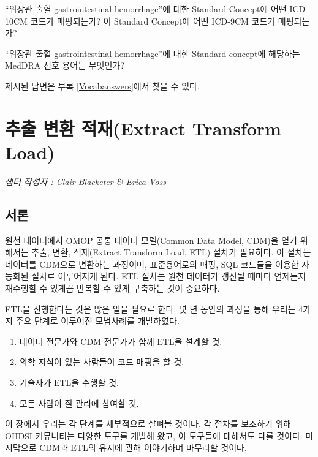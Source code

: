 \documentclass[11pt]{book}
\providecommand{\tightlist}{%
  \setlength{\itemsep}{0pt}\setlength{\parskip}{0pt}}
\theoremstyle{definition}
\theoremstyle{definition}
\theoremstyle{definition}
\theoremstyle{remark}
\let\BeginKnitrBlock\begin \let\EndKnitrBlock\end
\begin{document}
\BeginKnitrBlock{exercise}
\protect\hypertarget{exr:exerciseVocab2}{}{\label{exr:exerciseVocab2}
}``위장관 출혈 gastrointestinal hemorrhage''에 대한 Standard Concept에
어떤 ICD-10CM 코드가 매핑되는가? 이 Standard Concept에 어떤 ICD-9CM
코드가 매핑되는가?
\EndKnitrBlock{exercise}

\BeginKnitrBlock{exercise}
\protect\hypertarget{exr:exerciseVocab3}{}{\label{exr:exerciseVocab3}
}``위장관 출혈 gastrointestinal hemorrhage''에 대한 Standard concept에
해당하는 MedDRA 선호 용어는 무엇인가?
\EndKnitrBlock{exercise}

제시된 답변은 부록 \ref{Vocabanswers}에서 찾을 수 있다.

\chapter{추출 변환 적재(Extract Transform
Load)}\label{ExtractTransformLoad}

\emph{챕터 작성자 : Clair Blacketer \& Erica Voss}

\section{서론}

원천 데이터에서 OMOP 공통 데이터 모델(Common Data Model, CDM)을 얻기
위해서는 추출, 변환, 적재(Extract Transform Load, ETL) 절차가 필요하다.
이 절차는 데이터를 CDM으로 변환하는 과정이며, 표준용어로의 매핑, SQL
코드들을 이용한 자동화된 절차로 이루어지게 된다. ETL 절차는 원천
데이터가 갱신될 때마다 언제든지 재수행할 수 있게끔 반복할 수 있게
구축하는 것이 중요하다.
 
 

ETL을 진행한다는 것은 많은 일을 필요로 한다. 몇 년 동안의 과정을 통해
우리는 4가지 주요 단계로 이루어진 모범사례를 개발하였다.

\begin{enumerate}
\def\labelenumi{\arabic{enumi}.}
\tightlist
\item
  데이터 전문가와 CDM 전문가가 함께 ETL을 설계할 것.
\item
  의학 지식이 있는 사람들이 코드 매핑을 할 것.
\item
  기술자가 ETL을 수행할 것.
\item
  모든 사람이 질 관리에 참여할 것.
\end{enumerate}

이 장에서 우리는 각 단계를 세부적으로 살펴볼 것이다. 각 절차를 보조하기
위해 OHDSI 커뮤니티는 다양한 도구를 개발해 왔고, 이 도구들에 대해서도
다룰 것이다. 마지막으로 CDM과 ETL의 유지에 관해 이야기하며 마무리할
것이다.
\end{document}
